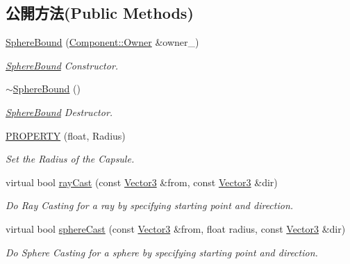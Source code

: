 \subsection*{公開方法(Public Methods)}
\begin{DoxyCompactItemize}
\item 
\hyperlink{class_i_dream_sky_1_1_sphere_bound_ad0985e38af18aef4548764c8ac834d97}{Sphere\+Bound} (\hyperlink{class_i_dream_sky_1_1_component_1_1_owner}{Component\+::\+Owner} \&owner\+\_\+)
\begin{DoxyCompactList}\small\item\em \hyperlink{class_i_dream_sky_1_1_sphere_bound}{Sphere\+Bound} Constructor. \end{DoxyCompactList}\item 
\hyperlink{class_i_dream_sky_1_1_sphere_bound_a6945c94afcf7753b176a3633fb73d58f}{$\sim$\+Sphere\+Bound} ()
\begin{DoxyCompactList}\small\item\em \hyperlink{class_i_dream_sky_1_1_sphere_bound}{Sphere\+Bound} Destructor. \end{DoxyCompactList}\item 
\hyperlink{class_i_dream_sky_1_1_sphere_bound_a3355db4fb5149449a57c63b664bc1bd7}{P\+R\+O\+P\+E\+R\+TY} (float, Radius)
\begin{DoxyCompactList}\small\item\em Set the Radius of the Capsule. \end{DoxyCompactList}\item 
virtual bool \hyperlink{class_i_dream_sky_1_1_sphere_bound_a0678ac647bb7374a3759000a1619bf45}{ray\+Cast} (const \hyperlink{class_i_dream_sky_1_1_vector3}{Vector3} \&from, const \hyperlink{class_i_dream_sky_1_1_vector3}{Vector3} \&dir)
\begin{DoxyCompactList}\small\item\em Do Ray Casting for a ray by specifying starting point and direction. \end{DoxyCompactList}\item 
virtual bool \hyperlink{class_i_dream_sky_1_1_sphere_bound_a3f4ad2ea0a478b6ec6aaf7f79f21899a}{sphere\+Cast} (const \hyperlink{class_i_dream_sky_1_1_vector3}{Vector3} \&from, float radius, const \hyperlink{class_i_dream_sky_1_1_vector3}{Vector3} \&dir)
\begin{DoxyCompactList}\small\item\em Do Sphere Casting for a sphere by specifying starting point and direction. \end{DoxyCompactList}\end{DoxyCompactItemize}


